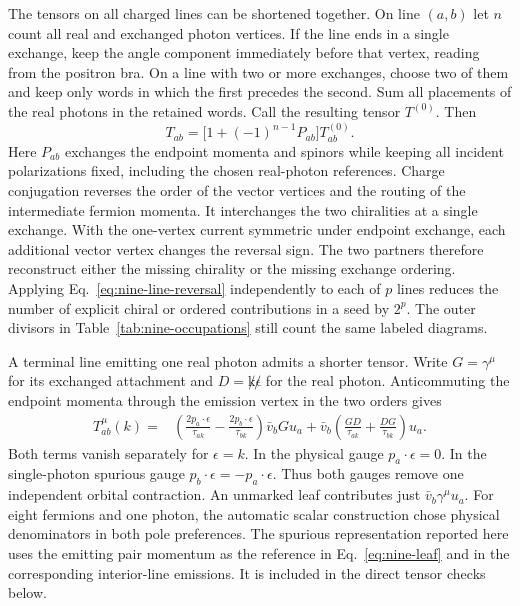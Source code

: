 The tensors on all charged lines can be shortened together. On line
$(a,b)$ let $n$ count all real and exchanged photon vertices. If the
line ends in a single exchange, keep the angle component immediately
before that vertex, reading from the positron bra. On a line with two
or more exchanges, choose two of them and keep only words in which the
first precedes the second. Sum all placements of the real photons in
the retained words. Call the resulting tensor $T^{(0)}$. Then
\begin{equation}
 T_{ab}=\big[1+(-1)^{n-1}P_{ab}\big]T^{(0)}_{ab}.
 \label{eq:nine-line-reversal}
\end{equation}
Here $P_{ab}$ exchanges the endpoint momenta and spinors while keeping
all incident polarizations fixed, including the chosen real-photon
references. Charge conjugation reverses the order of the vector
vertices and the routing of the intermediate fermion momenta. It
interchanges the two chiralities at a single exchange. With the
one-vertex current symmetric under endpoint exchange, each additional
vector vertex changes the reversal sign. The two partners therefore
reconstruct either the missing chirality or the missing exchange
ordering. Applying Eq.~\eqref{eq:nine-line-reversal} independently to
each of $p$ lines reduces the number of explicit chiral or ordered
contributions in a seed by $2^p$. The outer divisors in
Table~\ref{tab:nine-occupations} still count the same labeled diagrams.

A terminal line emitting one real photon admits a shorter tensor. Write
$G=\gamma^\mu$ for its exchanged attachment and $D=\not k\not\epsilon$
for the real photon. Anticommuting the endpoint momenta through the
emission vertex in the two orders gives
\begin{align}
 T_{ab}^{\mu}(k)={}&
 \left(\frac{2p_a\cdot\epsilon}{\tau_{ak}}
       -\frac{2p_b\cdot\epsilon}{\tau_{bk}}\right)\bar v_b G u_a
 +\bar v_b\left(\frac{GD}{\tau_{ak}}+\frac{DG}{\tau_{bk}}\right)u_a .
 \label{eq:nine-leaf}
\end{align}
Both terms vanish separately for $\epsilon=k$. In the physical gauge
$p_a\cdot\epsilon=0$. In the single-photon spurious gauge
$p_b\cdot\epsilon=-p_a\cdot\epsilon$. Thus both gauges remove one
independent orbital contraction. An unmarked leaf contributes just
$\bar v_b\gamma^\mu u_a$. For eight fermions and one photon, the automatic scalar
construction chose physical denominators in both pole preferences.
The spurious representation reported here uses the emitting pair momentum
as the reference in Eq.~\eqref{eq:nine-leaf} and in the corresponding
interior-line emissions. It is included in the direct tensor checks below.

